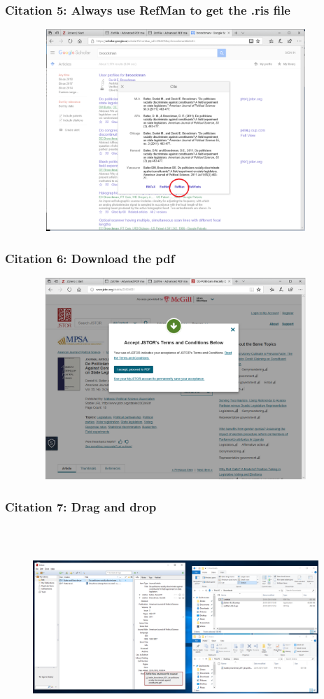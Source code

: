 \documentclass[12pt]{beamer}
\begin{document}
\begin{frame} \frametitle{Citation 5: Always use RefMan to get the .ris file} \begin{figure}[!h] \centering
	\includegraphics[height=3in, width = 4.25in,keepaspectratio]{zotero/citation_5.png}
\end{figure} \end{frame}

\begin{frame} \frametitle{Citation 6: Download the pdf} \begin{figure}[!h] \centering
	\includegraphics[height=3in, width = 4.25in,keepaspectratio]{zotero/citation_6.png}
\end{figure} \end{frame}

\begin{frame} \frametitle{Citation 7: Drag and drop} \begin{figure}[!h] \centering
	\includegraphics[height=3in, width = 4.25in,keepaspectratio]{zotero/citation_7.png}
\end{figure} \end{frame}
\end{document}
